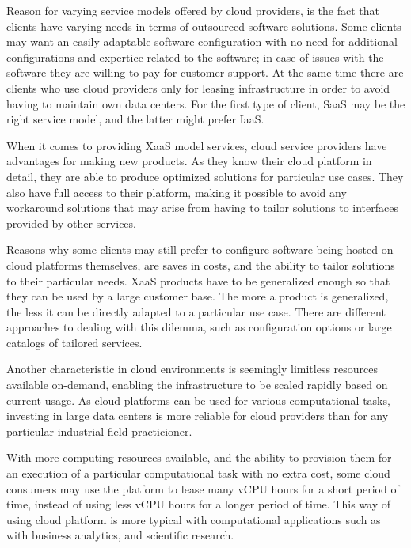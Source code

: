 \documentclass[officiallayout]{tktla}
\begin{document}
Reason for varying service models offered by cloud providers, is the fact that
clients have varying needs in terms of outsourced software solutions. Some
clients may want an easily adaptable software configuration with no need for
additional configurations and expertice related to the software; in case of
issues with the software they are willing to pay for customer support. At the
same time there are clients who use cloud providers only for leasing
infrastructure in order to avoid having to maintain own data centers. For the
first type of client, SaaS may be the right service model, and the latter might
prefer IaaS.

When it comes to providing XaaS model services, cloud service providers have
advantages for making new products. As they know their cloud platform in
detail, they are able to produce optimized solutions for particular use cases.
They also have full access to their platform, making it possible to avoid any
workaround solutions that may arise from having to tailor solutions to
interfaces provided by other services.

Reasons why some clients may still prefer to configure software being hosted on
cloud platforms themselves, are saves in costs, and the ability to tailor
solutions to their particular needs. XaaS products have to be generalized
enough so that they can be used by a large customer base. The more a product is
generalized, the less it can be directly adapted to a particular use case.
There are different approaches to dealing with this dilemma, such as
configuration options or large catalogs of tailored services.

Another characteristic in cloud environments is seemingly limitless resources
available on-demand, enabling the infrastructure to be scaled rapidly based on
current usage. As cloud platforms can be used for various computational tasks,
investing in large data centers is more reliable for cloud providers than for
any particular industrial field practicioner.

With more computing resources available, and the ability to provision them for
an execution of a particular computational task with no extra cost, some cloud
consumers may use the platform to lease many vCPU hours for a short period of
time, instead of using less vCPU hours for a longer period of time. This way of
using cloud platform is more typical with computational applications such as
with business analytics, and scientific research.
\end{document}

